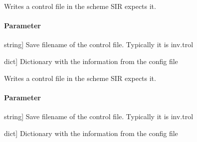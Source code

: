 \documentclass[letterpaper,10pt,english]{sphinxmanual}
\begin{document}
\begin{fulllineitems}
\label{\detokenize{functions:sir.write_control_1c}}
\pysigstartsignatures
{}
\pysigstopsignatures
\sphinxAtStartPar
Writes a control file in the scheme SIR expects it.


\paragraph{Parameter}
\label{\detokenize{functions:id21}}\begin{description}
\sphinxlineitem{filename}{[}string{]}
\sphinxAtStartPar
Save filename of the control file. Typically it is inv.trol

\sphinxlineitem{config}{[}dict{]}
\sphinxAtStartPar
Dictionary with the information from the config file

\end{description}

\end{fulllineitems}


\begin{fulllineitems}
\label{\detokenize{functions:sir.write_control_2c}}
\pysigstartsignatures
{}
\pysigstopsignatures
\sphinxAtStartPar
Writes a control file in the scheme SIR expects it.


\paragraph{Parameter}
\label{\detokenize{functions:id22}}\begin{description}
\sphinxlineitem{filename}{[}string{]}
\sphinxAtStartPar
Save filename of the control file. Typically it is inv.trol

\sphinxlineitem{conf}{[}dict{]}
\sphinxAtStartPar
Dictionary with the information from the config file

\end{description}

\end{fulllineitems}
\end{document}
